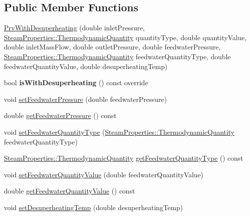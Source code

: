 \subsection*{Public Member Functions}
\begin{DoxyCompactItemize}
\item 
\hyperlink{class_prv_with_desuperheating_adfd7f6866e8b953dcc41e51bb5b31b58}{Prv\+With\+Desuperheating} (double inlet\+Pressure, \hyperlink{class_steam_properties_ae0294bedf7d178c2d8fb6aed0f62fbff}{Steam\+Properties\+::\+Thermodynamic\+Quantity} quantity\+Type, double quantity\+Value, double inlet\+Mass\+Flow, double outlet\+Pressure, double feedwater\+Pressure, \hyperlink{class_steam_properties_ae0294bedf7d178c2d8fb6aed0f62fbff}{Steam\+Properties\+::\+Thermodynamic\+Quantity} feedwater\+Quantity\+Type, double feedwater\+Quantity\+Value, double desuperheating\+Temp)
\item 
\mbox{\label{class_prv_with_desuperheating_ae7c08df31c2cc21077cbaff390261ac7}} 
bool {\bfseries is\+With\+Desuperheating} () const override
\item 
void \hyperlink{class_prv_with_desuperheating_a8494ebf87e5bd834f621b0c7ca257fbe}{set\+Feedwater\+Pressure} (double feedwater\+Pressure)
\item 
double \hyperlink{class_prv_with_desuperheating_a260bbe19272694af509fb408a821b041}{get\+Feedwater\+Pressure} () const
\item 
void \hyperlink{class_prv_with_desuperheating_a3efaf028d1e6b8349a9e064605cc8d7a}{set\+Feedwater\+Quantity\+Type} (\hyperlink{class_steam_properties_ae0294bedf7d178c2d8fb6aed0f62fbff}{Steam\+Properties\+::\+Thermodynamic\+Quantity} feedwater\+Quantity\+Type)
\item 
\hyperlink{class_steam_properties_ae0294bedf7d178c2d8fb6aed0f62fbff}{Steam\+Properties\+::\+Thermodynamic\+Quantity} \hyperlink{class_prv_with_desuperheating_aa6901e00ecf819d95f79c20ef1775876}{get\+Feedwater\+Quantity\+Type} () const
\item 
void \hyperlink{class_prv_with_desuperheating_afc17940f7d61898eda1bb4a6f1fea8c3}{set\+Feedwater\+Quantity\+Value} (double feedwater\+Quantity\+Value)
\item 
double \hyperlink{class_prv_with_desuperheating_a8645a251b2e77e434a8bc51dfedcad69}{get\+Feedwater\+Quantity\+Value} () const
\item 
void \hyperlink{class_prv_with_desuperheating_ade1b153c495efb451006b3c054ff386e}{set\+Desuperheating\+Temp} (double desuperheating\+Temp)

\end{DoxyCompactItemize}
